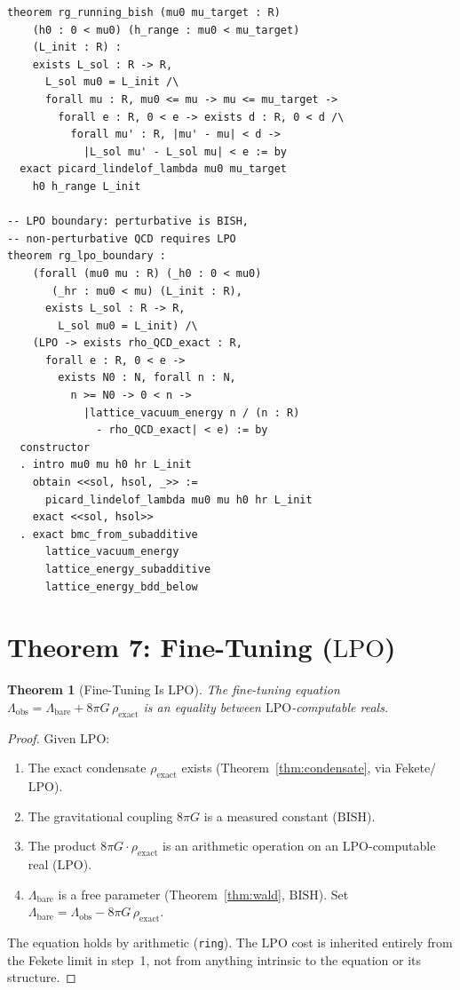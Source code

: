 \documentclass[11pt,a4paper]{article}
\theoremstyle{plain}
\newtheorem{theorem}{Theorem}[section]
\theoremstyle{definition}
\newcommand{\LPO}{\ensuremath{\mathrm{LPO}}}
\newcommand{\BISH}{\ensuremath{\mathrm{BISH}}}
\newcommand{\Lobs}{\Lambda_{\mathrm{obs}}}
\newcommand{\Lbare}{\Lambda_{\mathrm{bare}}}
\begin{document}
\begin{lstlisting}[caption={RG running: \texttt{RGRunningBISH.lean}}]
theorem rg_running_bish (mu0 mu_target : R)
    (h0 : 0 < mu0) (h_range : mu0 < mu_target)
    (L_init : R) :
    exists L_sol : R -> R,
      L_sol mu0 = L_init /\
      forall mu : R, mu0 <= mu -> mu <= mu_target ->
        forall e : R, 0 < e -> exists d : R, 0 < d /\
          forall mu' : R, |mu' - mu| < d ->
            |L_sol mu' - L_sol mu| < e := by
  exact picard_lindelof_lambda mu0 mu_target
    h0 h_range L_init

-- LPO boundary: perturbative is BISH,
-- non-perturbative QCD requires LPO
theorem rg_lpo_boundary :
    (forall (mu0 mu : R) (_h0 : 0 < mu0)
       (_hr : mu0 < mu) (L_init : R),
      exists L_sol : R -> R,
        L_sol mu0 = L_init) /\
    (LPO -> exists rho_QCD_exact : R,
      forall e : R, 0 < e ->
        exists N0 : N, forall n : N,
          n >= N0 -> 0 < n ->
            |lattice_vacuum_energy n / (n : R)
              - rho_QCD_exact| < e) := by
  constructor
  . intro mu0 mu h0 hr L_init
    obtain <<sol, hsol, _>> :=
      picard_lindelof_lambda mu0 mu h0 hr L_init
    exact <<sol, hsol>>
  . exact bmc_from_subadditive
      lattice_vacuum_energy
      lattice_energy_subadditive
      lattice_energy_bdd_below
\end{lstlisting}

\section{Theorem 7: Fine-Tuning ($\LPO$)}\label{sec:finetune}

\begin{theorem}[Fine-Tuning Is $\LPO$]\label{thm:finetune}
The fine-tuning equation
$\Lobs = \Lbare + 8\pi G\,\rho_{\mathrm{exact}}$
is an equality between $\LPO$-computable reals.
\end{theorem}

\begin{proof}
Given $\LPO$:
\begin{enumerate}[nosep]
\item The exact condensate $\rho_{\mathrm{exact}}$ exists
  (Theorem~\ref{thm:condensate}, via Fekete/$\LPO$).
\item The gravitational coupling $8\pi G$ is a measured constant ($\BISH$).
\item The product $8\pi G \cdot \rho_{\mathrm{exact}}$ is an arithmetic
  operation on an $\LPO$-computable real ($\LPO$).
\item $\Lbare$ is a free parameter (Theorem~\ref{thm:wald}, $\BISH$).
  Set $\Lbare = \Lobs - 8\pi G\,\rho_{\mathrm{exact}}$.
\end{enumerate}
The equation holds by arithmetic (\texttt{ring}).  The $\LPO$ cost is
inherited entirely from the Fekete limit in step~1, not from anything
intrinsic to the equation or its structure.
\end{proof}
\end{document}
